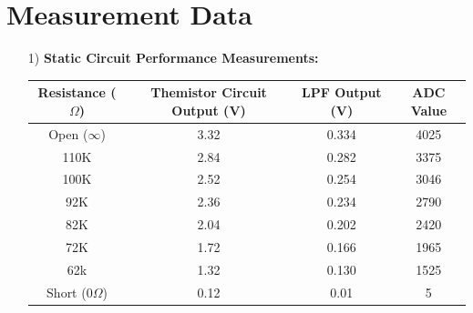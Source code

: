\documentclass{article}
\begin{document}
\section{Measurement Data}
	\begin{enumerate}
		\item[1)] %
			\textbf{Static Circuit Performance Measurements: }\\
			\begin{table}[h]
				\centering			
				\begin{tabular}{|c|c|c|c|}\hline
					Resistance ($\Omega$) & Themistor Circuit Output (V) & LPF Output (V) & ADC Value \\ \hline
					Open ($\infty$)	&	3.32	&	0.334	&	4025	\\ \hline
					110K 			&	2.84	&	0.282	&	3375	\\ \hline
					100K			&	2.52	&	0.254	&	3046	\\ \hline
					92K				&	2.36	&	0.234	&	2790	\\ \hline
					82K				&	2.04	&	0.202	&	2420	\\ \hline
					72K				&	1.72	&	0.166	&	1965	\\ \hline
					62k				&	1.32	&	0.130	& 	1525	\\ \hline
					Short (0$\Omega$)&	0.12	&	0.01	&	5		\\ \hline			
				\end{tabular}
			\end{table}
			

\end{enumerate}
\end{document}
